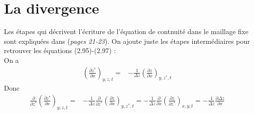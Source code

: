 \section*{La divergence}
Les étapes qui décrivent l'écriture de l'équation de contnuité dans le maillage fixe sont expliquées dans \cite{hervouet007} (\textit{pages 21-23}). On ajoute juste les étapes intermédiaires pour retrouver les équations (2.95)-(2.97) :\\
On a
\begin{align*}
\left(\frac{\partial z^*}{\partial x}\right)_{y,z,t}= & - \frac{1}{\Delta z} \left(\frac{\partial z}{\partial x}\right)_{y,z^*,t} 
\end{align*}
Donc
\begin{align*}
\frac{\partial}{\partial z^*} \left(\frac{\partial z^*}{\partial x}\right)_{y,z,t}= & - \frac{1}{\Delta z} \frac{\partial}{\partial z^*} \left(\frac{\partial z}{\partial x}\right)_{y,z^*,t} =  - \frac{1}{\Delta z} \frac{\partial}{\partial x} \left(\frac{\partial z}{\partial z^* }\right)_{x,y,t} = - \frac{1}{\Delta z} \frac{\partial \Delta z }{\partial x}
\end{align*}